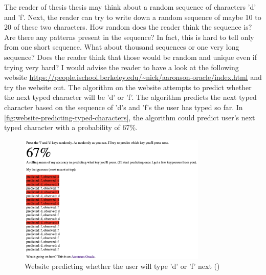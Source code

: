 \documentclass{BachelorBUI}
\begin{document}
        The reader of thesis thesis may think about a random sequence of characters 'd' and 'f'. Next, the reader can try to write down a random sequence of maybe 10 to 20 of these two characters. How random does the reader think the sequence is? Are there any patterns present in the sequence? In fact, this is hard to tell only from one short sequence. What about thousand sequences or one very long sequence? Does the reader think that those would be random and unique even if trying very hard? I would advise the reader to have a look at the following website \url{https://people.ischool.berkeley.edu/~nick/aaronson-oracle/index.html} and try the website out. The algorithm on the website attempts to predict whether the next typed character will be 'd' or 'f'. The algorithm predicts the next typed character based on the sequence of 'd's and 'f's the user has typed so far. In \autoref{fig:website-predicting-typed-characters}, the algorithm could predict user's next typed character with a probability of 67\%.

        \begin{figure}[h]
            \centering
            \includegraphics[width=0.8\textwidth]{website_predicting_typed_characters.png}
            \caption{Website predicting whether the user will type 'd' or 'f' next (\cite{website_predicting_typed_characters:2024})}
            \label{fig:website-predicting-typed-characters}
        \end{figure}
\end{document}
